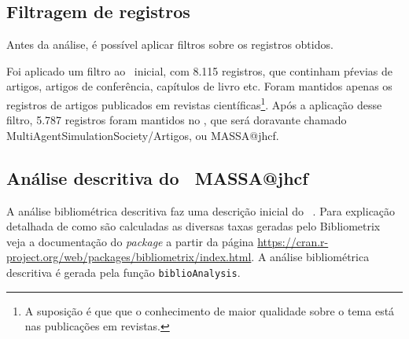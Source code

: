 \subsection{Filtragem de registros}
Antes da análise, é possível aplicar filtros sobre os registros obtidos.

Foi aplicado um filtro ao \dataset\   inicial, com 8.115 registros, que continham pŕevias de artigos, artigos de conferência, capítulos de livro etc. Foram mantidos apenas os registros de artigos publicados em revistas científicas\footnote{A suposição é que que o conhecimento de maior qualidade sobre o tema está nas publicações em revistas.}. Após a aplicação desse filtro, 5.787 registros foram mantidos no \dataset, que será doravante chamado MultiAgentSimulationSociety/Artigos, ou MASSA@jhcf.

\subsection{Análise descritiva do \dataset\   MASSA@jhcf}

A análise bibliométrica descritiva faz uma descrição inicial do \dataset\  . Para explicação detalhada de como são calculadas as diversas taxas geradas pelo Bibliometrix veja a documentação do \textit{package} a partir da página \url{https://cran.r-project.org/web/packages/bibliometrix/index.html}. A análise bibliométrica descritiva é gerada pela função \texttt{biblioAnalysis}.

